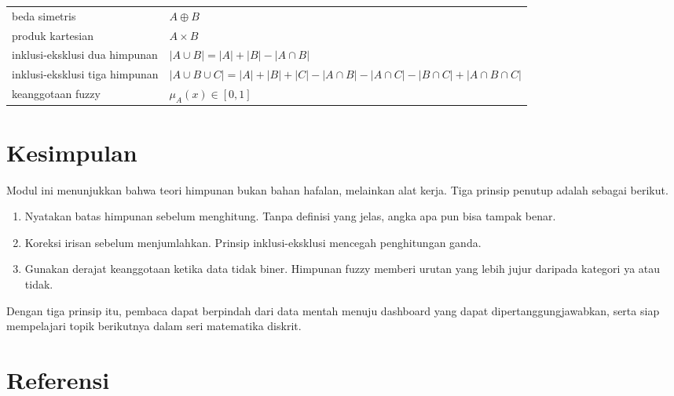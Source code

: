 \documentclass[11pt,a4paper]{article}
\begin{document}
\begin{table}[H]
\begin{tabularx}{\textwidth}{l X}
		beda simetris                  & $A \oplus B$                                                                       \\
		produk kartesian               & $A \times B$                                                                       \\
		inklusi-eksklusi dua himpunan  & $|A \cup B|=|A|+|B|-|A \cap B|$                                                    \\
		inklusi-eksklusi tiga himpunan & $|A \cup B \cup C|=|A|+|B|+|C|-|A \cap B|-|A \cap C|-|B \cap C|+|A \cap B \cap C|$ \\
		keanggotaan fuzzy              & $\mu_A(x) \in [0,1]$                                                               \\
		\bottomrule
	\end{tabularx}
\end{table}

\section{Kesimpulan}

Modul ini menunjukkan bahwa teori himpunan bukan bahan hafalan, melainkan alat kerja. Tiga prinsip penutup adalah sebagai berikut.

\begin{enumerate}
	\item Nyatakan batas himpunan sebelum menghitung. Tanpa definisi yang jelas, angka apa pun bisa tampak benar.
	\item Koreksi irisan sebelum menjumlahkan. Prinsip inklusi-eksklusi mencegah penghitungan ganda.
	\item Gunakan derajat keanggotaan ketika data tidak biner. Himpunan fuzzy memberi urutan yang lebih jujur daripada kategori ya atau tidak.
\end{enumerate}

Dengan tiga prinsip itu, pembaca dapat berpindah dari data mentah menuju dashboard yang dapat dipertanggungjawabkan, serta siap mempelajari topik berikutnya dalam seri matematika diskrit.

\newpage
\section*{Referensi}
\end{document}
